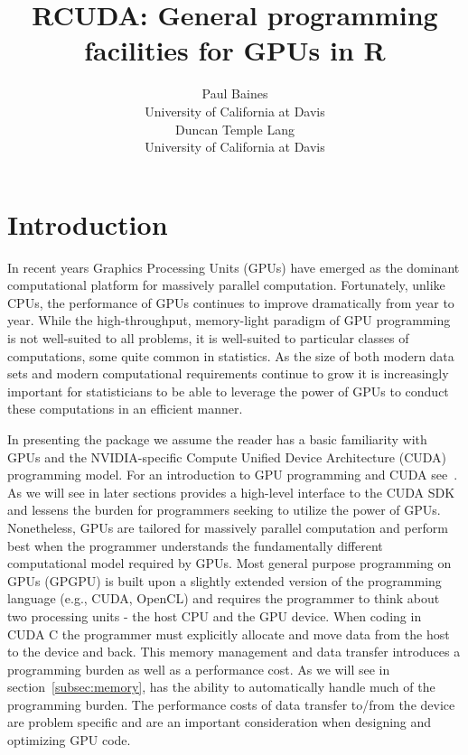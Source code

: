 \documentclass[article]{jss}
\author{Paul Baines\\University of California at Davis \\
 Duncan Temple Lang\\University of California at Davis}
\title{RCUDA: General programming facilities for GPUs in R}
\def\C{\proglang{C}}
\def\R{\proglang{R}}
\begin{document}


\section{Introduction}\label{sec:Introduction}
In recent years Graphics Processing Units (GPUs) have emerged as the 
dominant computational platform for massively  parallel computation. 
Fortunately, unlike CPUs, the performance of GPUs continues to improve
dramatically from year to year. While the high-throughput, memory-light
paradigm of GPU programming is not well-suited to all problems, it is
well-suited to particular classes of computations, some quite common in
statistics. As the size of both modern data sets and modern computational
requirements continue to grow it is increasingly important for statisticians
to be able to leverage the power of GPUs to conduct these computations in 
an efficient manner.


In presenting the  package we assume the reader has a basic
familiarity with GPUs and the NVIDIA-specific Compute Unified Device
Architecture (CUDA) programming model. For an introduction to GPU
programming and CUDA see~\cite{bib:pmpp}. As we will see in later sections
 provides a high-level interface to the CUDA SDK and lessens
the burden for \R{} programmers seeking to utilize the power of GPUs.
Nonetheless, GPUs are tailored for massively parallel computation and
perform best when the programmer understands the fundamentally different
computational model required by GPUs.
Most general purpose programming on GPUs (GPGPU) is built upon a slightly extended
version of the  \C{}  programming language (e.g., CUDA, OpenCL) and requires
the programmer to think about two processing units - the host CPU
and the GPU device. When coding in CUDA C the programmer must explicitly 
allocate and move data from the host to the device and back. This memory 
management and data transfer introduces a programming burden as well as a 
performance cost. As we will see in section~\ref{subsec:memory},  
has the ability to automatically handle much of the programming burden. 
The performance costs of data transfer to/from the device are problem specific
and are an important consideration when designing and optimizing GPU code.
\end{document}
